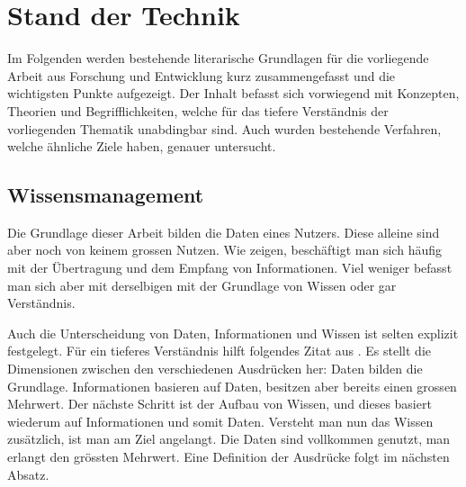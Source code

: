 


\chapter{Stand der Technik} \label{literatur}


Im Folgenden werden bestehende literarische Grundlagen für die vorliegende Arbeit aus Forschung und Entwicklung kurz zusammengefasst und die wichtigsten Punkte aufgezeigt. Der Inhalt befasst sich vorwiegend mit Konzepten, Theorien und Begrifflichkeiten, welche für das tiefere Verständnis der vorliegenden Thematik unabdingbar sind. Auch wurden bestehende Verfahren, welche ähnliche Ziele haben, genauer untersucht.





\section{Wissensmanagement}



Die Grundlage dieser Arbeit bilden die Daten eines Nutzers. Diese alleine sind aber noch von keinem grossen Nutzen. Wie \cite{bellinger2004data}
 zeigen, beschäftigt man sich häufig mit der Übertragung und dem Empfang von Informationen. Viel weniger befasst man sich aber mit derselbigen mit der Grundlage von Wissen oder gar Verständnis. 
 
 Auch die Unterscheidung von Daten, Informationen und Wissen ist selten explizit festgelegt. Für ein tieferes Verständnis hilft folgendes Zitat  aus \cite{ackoff1989data}. Es stellt die Dimensionen zwischen den verschiedenen Ausdrücken her: Daten bilden die Grundlage. Informationen basieren auf Daten, besitzen aber bereits einen grossen Mehrwert. Der nächste Schritt ist der Aufbau von Wissen, und dieses basiert wiederum auf Informationen und somit Daten. Versteht man nun das Wissen zusätzlich, ist man am Ziel angelangt. Die Daten sind vollkommen genutzt, man erlangt den grössten Mehrwert. Eine Definition der Ausdrücke folgt im nächsten Absatz.

